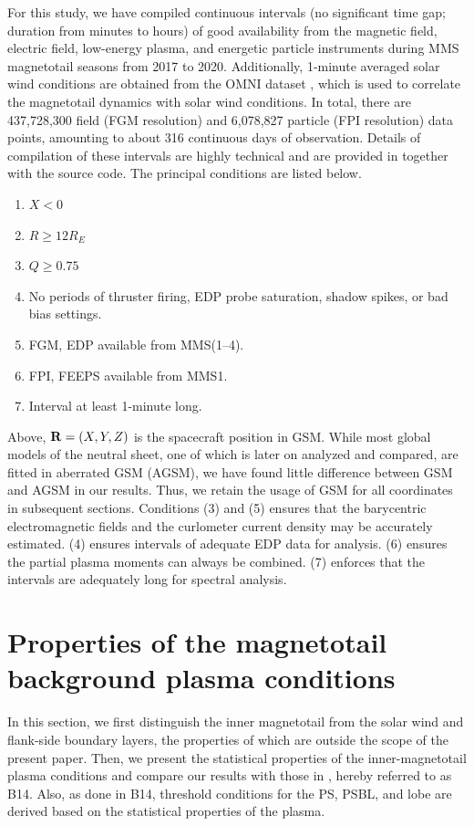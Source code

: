 \documentclass[draft]{agujournal2019}
\begin{document}
For this study, we have compiled continuous intervals (no significant time gap; duration from minutes to hours) of good availability from the magnetic field, electric field, low-energy plasma, and energetic particle instruments during MMS magnetotail seasons from 2017 to 2020. Additionally, 1-minute averaged solar wind conditions are obtained from the OMNI dataset \cite{King2005}, which is used to correlate the magnetotail dynamics with solar wind conditions. In total, there are 437,728,300 field (FGM resolution) and 6,078,827 particle (FPI resolution) data points, amounting to about 316 continuous days of observation. Details of compilation of these intervals are highly technical and are provided in  together with the source code. The principal conditions are listed below.
\begin{enumerate}
    \item ${X<0}$
    \item ${R\geq 12R_E}$
    \item ${Q\geq0.75}$
    \item No periods of thruster firing, EDP probe saturation, shadow spikes, or bad bias settings.
    \item FGM, EDP available from MMS(1--4).
    \item FPI, FEEPS available from MMS1.
    \item Interval at least 1-minute long.
\end{enumerate}
Above, ${\vb{R}=(X,Y,Z)}$ is the spacecraft position in GSM. While most global models of the neutral sheet, one of which is later on analyzed and compared, are fitted in aberrated GSM (AGSM), we have found little difference between GSM and AGSM in our results. Thus, we retain the usage of GSM for all coordinates in subsequent sections. Conditions (3) and (5) ensures that the barycentric electromagnetic fields and the curlometer current density may be accurately estimated. (4) ensures intervals of adequate EDP data for analysis. (6) ensures the partial plasma moments can always be combined. (7) enforces that the intervals are adequately long for spectral analysis.

\section{Properties of the magnetotail background plasma conditions}\label{sec:background_parameters}

In this section, we first distinguish the inner magnetotail from the solar wind and flank-side boundary layers, the properties of which are outside the scope of the present paper. Then, we present the statistical properties of the inner-magnetotail plasma conditions and compare our results with those in , hereby referred to as B14. Also, as done in B14, threshold conditions for the PS, PSBL, and lobe are derived based on the statistical properties of the plasma.
\end{document}
